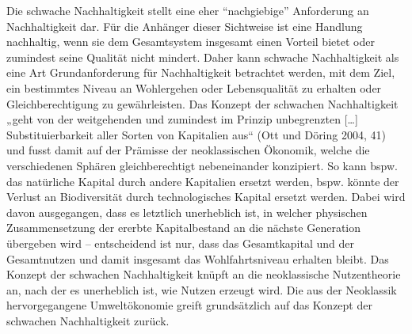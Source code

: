 \documentclass[
  nswissgerman,
  a4paper,
  DIV=11,
  numbers=noendperiod,
  oneside,
  openany]{scrreprt}
\begin{document}
Die schwache Nachhaltigkeit stellt eine eher ``nachgiebige'' Anforderung
an Nachhaltigkeit dar. Für die Anhänger dieser Sichtweise ist eine
Handlung nachhaltig, wenn sie dem Gesamtsystem insgesamt einen Vorteil
bietet oder zumindest seine Qualität nicht mindert. Daher kann schwache
Nachhaltigkeit als eine Art Grundanforderung für Nachhaltigkeit
betrachtet werden, mit dem Ziel, ein bestimmtes Niveau an Wohlergehen
oder Lebensqualität zu erhalten oder Gleichberechtigung zu
gewährleisten. Das Konzept der schwachen Nachhaltigkeit „geht von der
weitgehenden und zumindest im Prinzip unbegrenzten {[}\ldots{]}
Substituierbarkeit aller Sorten von Kapitalien aus`` (Ott und Döring
2004, 41) und fusst damit auf der Prämisse der neoklassischen Ökonomik,
welche die verschiedenen Sphären gleichberechtigt nebeneinander
konzipiert. So kann bspw. das natürliche Kapital durch andere Kapitalien
ersetzt werden, bspw. könnte der Verlust an Biodiversität durch
technologisches Kapital ersetzt werden. Dabei wird davon ausgegangen,
dass es letztlich unerheblich ist, in welcher physischen Zusammensetzung
der ererbte Kapitalbestand an die nächste Generation übergeben wird --
entscheidend ist nur, dass das Gesamtkapital und der Gesamtnutzen und
damit insgesamt das Wohlfahrtsniveau erhalten bleibt. Das Konzept der
schwachen Nachhaltigkeit knüpft an die neoklassische Nutzentheorie an,
nach der es unerheblich ist, wie Nutzen erzeugt wird. Die aus der
Neoklassik hervorgegangene Umweltökonomie greift grundsätzlich auf das
Konzept der schwachen Nachhaltigkeit zurück.
\end{document}
